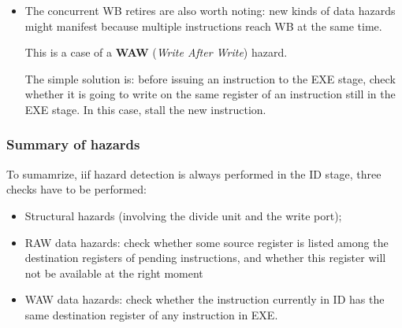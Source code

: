 \documentclass[a4paper,11pt]{article}
\begin{document}
\begin{itemize}
\begin{itemize}
		            As with the before example, the long stall is due to the hefty execution size of the floating point instructions, which keeps the target register "locked" for more than our integer pipeline did.

		            This is a case of a \textbf{RAW} (\textit{Read After Write}) hazard;

		      \item The concurrent WB retires are also worth noting: new kinds of data hazards might manifest because multiple instructions reach WB at the same time.

		            This is a case of a \textbf{WAW} (\textit{Write After Write}) hazard.

		            The simple solution is: before issuing an instruction to the EXE stage, check
		            whether it is going to write on the same register of an
		            instruction still in the EXE stage.
		            In this case, stall the new instruction.
	      \end{itemize}

\end{itemize}

\subsubsection{Summary of hazards}

To sumamrize, iif hazard detection is always performed in the ID stage,
three checks have to be performed:
\begin{itemize}
	\item Structural hazards (involving the divide unit and the write port);
	\item RAW data hazards: check whether some source
	      register is listed among the destination registers of
	      pending instructions, and whether this register will
	      not be available at the right moment
	\item WAW data hazards: check whether the instruction
	      currently in ID has the same destination register of
	      any instruction in EXE.
\end{itemize}
\end{document}
